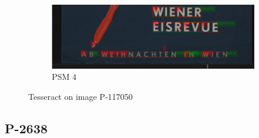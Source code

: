 \begin{figure}[hbtp!]
    \begin{subfigure}{\textwidth}
        \centering
        \includegraphics[scale=0.36]{obrazky/plakaty/result_tesseract_vienna1_split_psm4-21.png}
        \caption{PSM 4}
        \label{Im2:ex:tess4}
    \end{subfigure}
    \caption{Tesseract on image P-117050}
    \label{Im2:ex:tess}
\end{figure}


\subsection*{P-2638}

